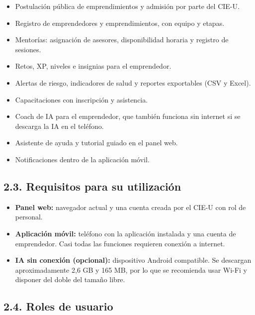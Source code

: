 \documentclass[12pt,letterpaper]{article}
\begin{document}
\begin{itemize}
\item Postulación pública de emprendimientos y admisión por parte del CIE-U.
\item Registro de emprendedores y emprendimientos, con equipo y etapas.
\item Mentorías: asignación de asesores, disponibilidad horaria y registro de sesiones.
\item Retos, XP, niveles e insignias para el emprendedor.
\item Alertas de riesgo, indicadores de salud y reportes exportables (CSV y Excel).
\item Capacitaciones con inscripción y asistencia.
\item Coach de IA para el emprendedor, que también funciona sin internet si se descarga la IA en el teléfono.
\item Asistente de ayuda y tutorial guiado en el panel web.
\item Notificaciones dentro de la aplicación móvil.
\end{itemize}

\subsection*{2.3. Requisitos para su utilización}


\begin{itemize}
\item \textbf{Panel web:} navegador actual y una cuenta creada por el CIE-U con rol de personal.
\item \textbf{Aplicación móvil:} teléfono con la aplicación instalada y una cuenta de emprendedor. Casi todas las funciones requieren conexión a internet.
\item \textbf{IA sin conexión (opcional):} dispositivo Android compatible. Se descargan aproximadamente 2,6 GB y 165 MB, por lo que se recomienda usar Wi-Fi y disponer del doble del tamaño libre.
\end{itemize}

\subsection*{2.4. Roles de usuario}

\end{document}
